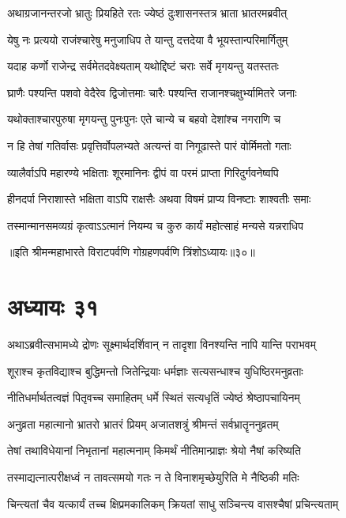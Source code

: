 \twolineshloka
{अथाग्रजानन्तरजो भ्रातुः प्रियहिते रतः}
{ज्येष्ठं दुःशासनस्तत्र भ्राता भ्रातरमब्रवीत्}


\twolineshloka
{येषु नः प्रत्ययो राजंश्चारेषु मनुजाधिप}
{ते यान्तु दत्तदेया वै भूयस्तान्परिमार्गितुम्}


\twolineshloka
{यदाह कर्णो राजेन्द्र सर्वमेतदवेक्ष्यताम्}
{यथोद्दिष्टं चराः सर्वे मृगयन्तु यतस्ततः}


\twolineshloka
{घ्राणैः पश्यन्ति पशवो वेदैरेव द्विजोत्तमाः}
{चारैः पश्यन्ति राजानश्चक्षुर्भ्यामितरे जनाः}


\twolineshloka
{यथोक्ताश्चारपुरुषा मृगयन्तु पुनःपुनः}
{एते चान्ये च बहवो देशांश्च नगराणि च}


\twolineshloka
{न हि तेषां गतिर्वासः प्रवृत्तिर्वोपलभ्यते}
{अत्यन्तं वा निगूढास्ते पारं वोर्मिमतो गताः}


\twolineshloka
{व्यालैर्वाऽपि महारण्ये भक्षिताः शूरमानिनः}
{द्वीपं वा परमं प्राप्ता गिरिदुर्गवनेष्वपि}


\twolineshloka
{हीनदर्पा निराशास्ते भक्षिता वाऽपि राक्षसैः}
{अथवा विषमं प्राप्य विनष्टाः शाश्वतीः समाः}


\twolineshloka
{तस्मान्मानसमव्यग्रं कृत्वाऽऽत्मानं नियम्य च}
{कुरु कार्यं महोत्साहं मन्यसे यन्नराधिप}

॥इति श्रीमन्महाभारते विराटपर्वणि गोग्रहणपर्वणि त्रिंशोऽध्यायः॥३०॥

\chapter{अध्यायः ३१}

\twolineshloka
{अथाऽब्रवीत्सभामध्ये द्रोणः सूक्ष्मार्थदर्शिवान्}
{न तादृशा विनश्यन्ति नापि यान्ति पराभवम्}


\twolineshloka
{शूराश्च कृतविद्याश्च बुद्धिमन्तो जितेन्द्रियाः}
{धर्मज्ञाः सत्यसन्धाश्च युधिष्ठिरमनुव्रताः}


\twolineshloka
{नीतिधर्मार्थतत्वज्ञं पितृवच्च समाहितम्}
{धर्मे स्थितं सत्यधृतिं ज्येष्ठं श्रेष्ठापचायिनम्}


\twolineshloka
{अनुव्रता महात्मानो भ्रातरो भ्रातरं प्रियम्}
{अजातशत्रुं श्रीमन्तं सर्वभ्रातॄननुव्रतम्}


\twolineshloka
{तेषां तथाविधेयानां निभृतानां महात्मनाम्}
{किमर्थं नीतिमान्प्राज्ञः श्रेयो नैषां करिष्यति}


\twolineshloka
{तस्माद्यत्नात्परीक्षध्वं न तावत्समयो गतः}
{न ते विनाशमृच्छेयुरिति मे नैष्ठिकी मतिः}


\twolineshloka
{चिन्त्यतां चैव यत्कार्यं तच्च क्षिप्रमकालिकम्}
{क्रियतां साधु सञ्चिन्त्य वासश्चैषां प्रचिन्त्यताम्}



